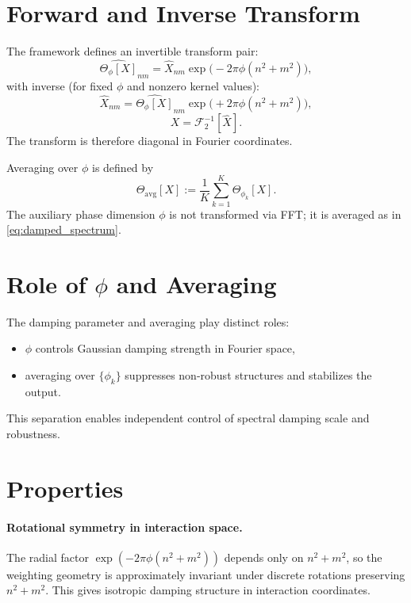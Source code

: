 \documentclass[11pt]{article}
\begin{document}
\section{Forward and Inverse Transform}
The framework defines an invertible transform pair:
\begin{equation}
\widehat{\Theta_{\phi}[X]}_{nm}=\widehat{X}_{nm}\exp\!\big(-2\pi\phi(n^2+m^2)\big),
\label{eq:inverse_fft}
\end{equation}
with inverse (for fixed $\phi$ and nonzero kernel values):
\begin{equation}
\widehat{X}_{nm}=\widehat{\Theta_{\phi}[X]}_{nm}\exp\!\big(+2\pi\phi(n^2+m^2)\big),
\label{eq:inverse_weight}
\end{equation}
\begin{equation}
X=\mathcal{F}_2^{-1}[\widehat{X}].
\label{eq:inverse_operator}
\end{equation}
The transform is therefore diagonal in Fourier coordinates.

Averaging over $\phi$ is defined by
\begin{equation}
\Theta_{\mathrm{avg}}[X] := \frac{1}{K}\sum_{k=1}^{K}\Theta_{\phi_k}[X].
\label{eq:damped_spectrum}
\end{equation}
The auxiliary phase dimension $\phi$ is not transformed via FFT; it is averaged as in \eqref{eq:damped_spectrum}.

\section{Role of $\phi$ and Averaging}
The damping parameter and averaging play distinct roles:
\begin{itemize}
    \item $\phi$ controls Gaussian damping strength in Fourier space,
    \item averaging over $\{\phi_k\}$ suppresses non-robust structures and stabilizes the output.
\end{itemize}
This separation enables independent control of spectral damping scale and robustness.

\section{Properties}
\paragraph{Rotational symmetry in interaction space.}
The radial factor $\exp(-2\pi\phi(n^2+m^2))$ depends only on $n^2+m^2$, so the weighting geometry is approximately invariant under discrete rotations preserving $n^2+m^2$. This gives isotropic damping structure in interaction coordinates.
\end{document}
